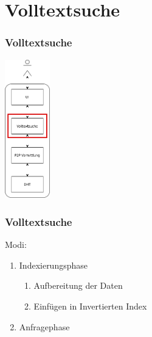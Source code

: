 \documentclass{beamer}
\begin{document}
\section{Volltextsuche}
\begin{frame}
  \frametitle{Volltextsuche}

  \begin{center}
    \includegraphics[height=6cm]{Schichten-alt-volltext}
  \end{center}
\end{frame}

\begin{frame}
  \frametitle{Volltextsuche}

  Modi:
  \begin{enumerate}
    \item Indexierungsphase
      \begin{enumerate}[a]
        \item Aufbereitung der Daten
        \item Einfügen in Invertierten Index
      \end{enumerate}
    \item Anfragephase
  \end{enumerate}
\end{frame}
\end{document}

